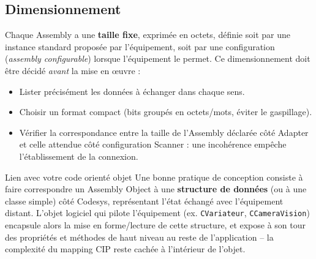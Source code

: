 \subsection{Dimensionnement}
Chaque Assembly a une \textbf{taille fixe}, exprimée en octets, définie soit par une instance standard proposée par l'équipement, soit par une configuration (\emph{assembly configurable}) lorsque l'équipement le permet. Ce dimensionnement doit être décidé \emph{avant} la mise en \oe uvre :
\begin{itemize}
    \item Lister précisément les données à échanger dans chaque sens.
    \item Choisir un format compact (bits groupés en octets/mots, éviter le gaspillage).
    \item Vérifier la correspondance entre la taille de l'Assembly déclarée côté Adapter et celle attendue côté configuration Scanner : une incohérence empêche l'établissement de la connexion.
\end{itemize}

\begin{UPSTIidee}{Lien avec votre code orienté objet}
    Une bonne pratique de conception consiste à faire correspondre un Assembly Object à une \textbf{structure de données} (ou à une classe simple) côté Codesys, représentant l'état échangé avec l'équipement distant. L'objet logiciel qui pilote l'équipement (ex. \texttt{CVariateur}, \texttt{CCameraVision}) encapsule alors la mise en forme/lecture de cette structure, et expose à son tour des propriétés et méthodes de haut niveau au reste de l'application -- la complexité du mapping CIP reste cachée à l'intérieur de l'objet.
\end{UPSTIidee}
